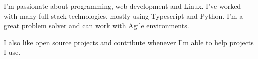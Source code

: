 

\begin{cvparagraph}

I'm passionate about programming, web development
and Linux.
I've worked with many full stack technologies, mostly using
Typescript and Python.
I'm a great problem solver and can work with Agile
environments.
\end{cvparagraph}

\begin{cvparagraph}

I also like open source projects and contribute whenever I'm able to help projects I use.


\end{cvparagraph}